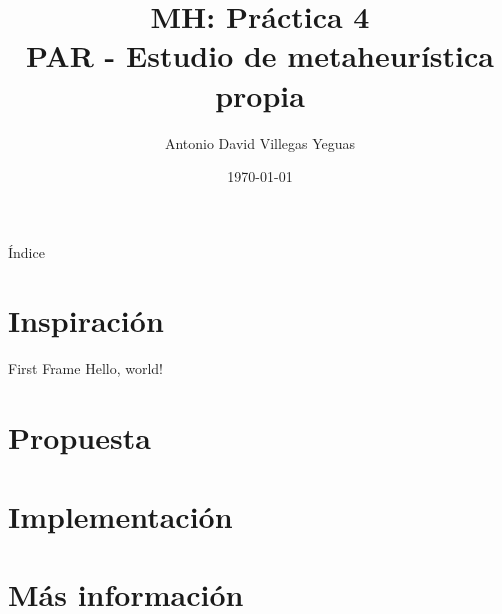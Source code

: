 \documentclass{beamer}
\title{MH: Práctica 4\\
			PAR - Estudio de metaheurística propia}
\date{\today}
\author{Antonio David Villegas Yeguas}
\institute{Universidad de Granada\\
\medskip
\textit{advy99@correo.ugr.es}
}
\begin{document}
  \maketitle

\begin{frame}{Índice}
\tableofcontents
\end{frame}
  
  
  \section{Inspiración}
  \begin{frame}{First Frame}
    Hello, world!
  \end{frame}
  
  \section{Propuesta}
  
  \section{Implementación}
  
  \section{Más información}
\end{document}
